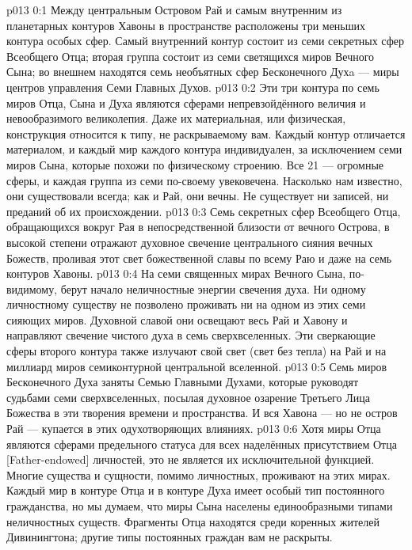 \author{Совершенствователь Мудрости}
\vs p013 0:1 Между центральным Островом Рай и самым внутренним из планетарных контуров Хавоны в пространстве расположены три меньших контура особых сфер. Самый внутренний контур состоит из семи секретных сфер Всеобщего Отца; вторая группа состоит из семи светящихся миров Вечного Сына; во внешнем находятся семь необъятных сфер Бесконечного Духa --- миры центров управления Семи Главных Духов.
\vs p013 0:2 Эти три контура по семь миров Отца, Сына и Духа являются сферами непревзойдённого величия и невообразимого великолепия. Даже их материальная, или физическая, конструкция относится к типу, не раскрываемому вам. Каждый контур отличается материалом, и каждый мир каждого контура индивидуален, за исключением семи миров Сына, которые похожи по физическому строению. Все 21 --- огромные сферы, и каждая группа из семи по\hyp{}своему увековечена. Насколько нам известно, они существовали всегда; как и Рай, они вечны. Не существует ни записей, ни преданий об их происхождении.
\vs p013 0:3 \pc Семь секретных сфер Всеобщего Отца, обращающихся вокруг Рая в непосредственной близости от вечного Острова, в высокой степени отражают духовное свечение центрального сияния вечных Божеств, проливая этот свет божественной славы по всему Раю и даже на семь контуров Хавоны.
\vs p013 0:4 \pc На семи священных мирах Вечного Сына, по\hyp{}видимому, берут начало неличностные энергии свечения духа. Ни одному личностному существу не позволено проживать ни на одном из этих семи сияющих миров. Духовной славой они освещают весь Рай и Хавону и направляют свечение чистого духа в семь сверхвселенных. Эти сверкающие сферы второго контура также излучают свой свет (свет без тепла) на Рай и на миллиард миров семиконтурной центральной вселенной.
\vs p013 0:5 \pc Семь миров Бесконечного Духа заняты Семью Главными Духами, которые руководят судьбами семи сверхвселенных, посылая духовное озарение Третьего Лица Божества в эти творения времени и пространства. И вся Хавона --- но не остров Рай --- купается в этих одухотворяющих влияниях.
\vs p013 0:6 \pc Хотя миры Отца являются сферами предельного статуса для всех наделённых присутствием Отца [Father\hyp{}endowed] личностей, это не является их исключительной функцией. Многие существа и сущности, помимо личностных, проживают на этих мирах. Каждый мир в контуре Отца и в контуре Духа имеет особый тип постоянного гражданства, но мы думаем, что миры Сына населены единообразными типами неличностных существ. Фрагменты Отца находятся среди коренных жителей Дивинингтона; другие типы постоянных граждан вам не раскрыты.
